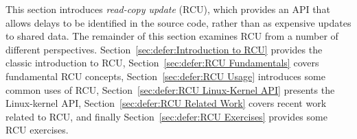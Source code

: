 This section introduces \emph{read-copy update} (RCU), which provides
an API that allows delays to be identified in the source code,
rather than as expensive updates to shared data.
The remainder of this
section examines RCU from a number of different perspectives.
Section~\ref{sec:defer:Introduction to RCU} provides the classic
introduction to RCU,
Section~\ref{sec:defer:RCU Fundamentals} covers fundamental RCU
concepts,
Section~\ref{sec:defer:RCU Usage} introduces some common uses of RCU,
Section~\ref{sec:defer:RCU Linux-Kernel API} presents the Linux-kernel
API,
Section~\ref{sec:defer:RCU Related Work} covers recent work related
to RCU,
and finally
Section~\ref{sec:defer:RCU Exercises} provides some RCU exercises.
\fi






